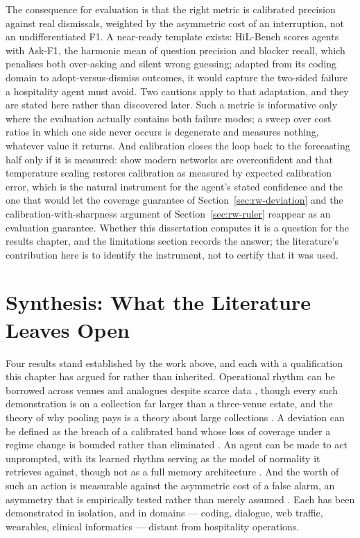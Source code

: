 The consequence for evaluation is that the right metric is calibrated precision
against real dismissals, weighted by the asymmetric cost of an interruption,
not an undifferentiated F1. A near-ready template exists: HiL-Bench
\citep[a 2026 preprint]{trinh_hil-bench_2026} scores agents with Ask-F1, the
harmonic mean of question precision and blocker recall, which penalises both
over-asking and silent wrong guessing; adapted from its coding domain to
adopt-versus-dismiss outcomes, it would capture the two-sided failure a
hospitality agent must avoid. Two cautions apply to that adaptation, and they
are stated here rather than discovered later. Such a metric is informative only
where the evaluation actually contains both failure modes; a sweep over cost
ratios in which one side never occurs is degenerate and measures nothing,
whatever value it returns. And calibration closes the loop back to the
forecasting half only if it is measured: \citet{guo_calibration_2017} show
modern networks are overconfident and that temperature scaling restores
calibration as measured by expected calibration error, which is the natural
instrument for the agent's stated confidence and the one that would let the
coverage guarantee of Section~\ref{sec:rw-deviation} and the
calibration-with-sharpness argument of Section~\ref{sec:rw-ruler} reappear as
an evaluation guarantee. Whether this dissertation computes it is a question
for the results chapter, and the limitations section records the answer; the
literature's contribution here is to identify the instrument, not to certify
that it was used.

\section{Synthesis: What the Literature Leaves Open}
\label{sec:rw-synthesis}

Four results stand established by the work above, and each with a qualification
this chapter has argued for rather than inherited. Operational rhythm can be
borrowed across venues and analogues despite scarce data
\citep{das_-context_2025,zhou_context-driven_2025,liu_generative_2024}, though
every such demonstration is on a collection far larger than a three-venue
estate, and the theory of why pooling pays is a theory about large collections
\citep{montero-manso_principles_2021}. A deviation can be defined as the breach
of a calibrated band whose loss of coverage under a regime change is bounded
rather than eliminated
\citep{sun_conformal_2025,barber_conformal_2023,liu_elephant_2024}. An agent
can be made to act unprompted, with its learned rhythm serving as the model of
normality it retrieves against, though not as a full memory architecture
\citep{lu_proactive_2024,hu_memory_2026,park_generative_2023}. And the worth of
such an action is measurable against the asymmetric cost of a false alarm, an
asymmetry that is empirically tested rather than merely assumed
\citep{meyer_conceptual_2004,dixon_independence_2007,ancker_effects_2017,fu_prism_2026,trinh_hil-bench_2026}.
Each has been demonstrated in isolation, and in domains --- coding, dialogue,
web traffic, wearables, clinical informatics --- distant from hospitality
operations.

